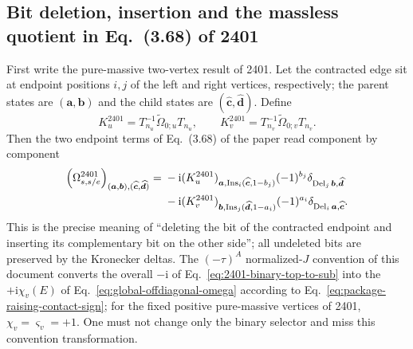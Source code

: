 \documentclass[11pt,a4paper]{article}
\newcommand{\ii}{\mathrm i}
\begin{document}
\subsection{Bit deletion, insertion and the massless quotient in Eq.~(3.68) of 2401}

First write the pure-massive two-vertex result of 2401. Let the contracted edge sit at endpoint positions $i,j$ of the left and right vertices, respectively; the parent states are $(\bm a,\bm b)$ and the child states are $(\widehat{\bm c},\widehat{\bm d})$. Define
\begin{equation}
 K_u^{2401}=T_{n_u}^{-1}\widetilde\Omega_{0;u}T_{n_u},
 \qquad
 K_v^{2401}=T_{n_v}^{-1}\widetilde\Omega_{0;v}T_{n_v}.
 \label{eq:component-log-kernel}
\end{equation}
Then the two endpoint terms of Eq.~(3.68) of the paper read component by component
\begin{align}
 \left(\Omega_{s,s/e}^{2401}\right)_{(\bm a,\bm b),(\widehat{\bm c},\widehat{\bm d})}
={}&-\ii
 (K_u^{2401})_{\bm a,\operatorname{Ins}_i(\widehat{\bm c},1-b_j)}
 (-1)^{b_j}
 \delta_{\operatorname{Del}_j\bm b,\widehat{\bm d}}
 \notag\\
 &-\ii
 (K_v^{2401})_{\bm b,\operatorname{Ins}_j(\widehat{\bm d},1-a_i)}
 (-1)^{a_i}
 \delta_{\operatorname{Del}_i\bm a,\widehat{\bm c}}.
 \label{eq:2401-binary-top-to-sub}
\end{align}
This is the precise meaning of ``deleting the bit of the contracted endpoint and inserting its complementary bit on the other side''; all undeleted bits are preserved by the Kronecker deltas. The $(-\tau)^A$ normalized-$J$ convention of this document converts the overall $-\ii$ of Eq.~\eqref{eq:2401-binary-top-to-sub} into the $+\ii\chi_v(E)$ of Eq.~\eqref{eq:global-offdiagonal-omega} according to Eq.~\eqref{eq:package-raising-contact-sign}; for the fixed positive pure-massive vertices of 2401, $\chi_v=\varsigma_v=+1$. One must not change only the binary selector and miss this convention transformation.
\end{document}
